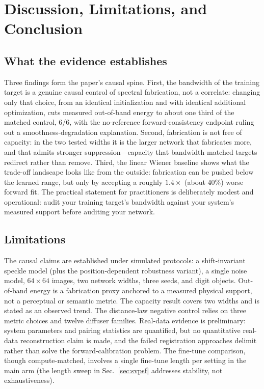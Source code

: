 \section{Discussion, Limitations, and Conclusion}
\label{sec:discussion}

\subsection{What the evidence establishes}

Three findings form the paper's causal spine. First, the bandwidth of the training target is a genuine causal control of spectral fabrication, not a correlate: changing only that choice, from an identical initialization and with identical additional optimization, cuts measured out-of-band energy to about one third of the matched control, 6/6, with the no-reference forward-consistency endpoint ruling out a smoothness-degradation explanation. Second, fabrication is not free of capacity: in the two tested widths it is the larger network that fabricates more, and that admits stronger suppression---capacity that bandwidth-matched targets redirect rather than remove. Third, the linear Wiener baseline shows what the trade-off landscape looks like from the outside: fabrication can be pushed below the learned range, but only by accepting a roughly $1.4\times$ (about $40\%$) worse forward fit. The practical statement for practitioners is deliberately modest and operational: audit your training target's bandwidth against your system's measured support before auditing your network.

\subsection{Limitations}

The causal claims are established under simulated protocols: a shift-invariant speckle model (plus the position-dependent robustness variant), a single noise model, $64\times64$ images, two network widths, three seeds, and digit objects. Out-of-band energy is a fabrication proxy anchored to a measured physical support, not a perceptual or semantic metric. The capacity result covers two widths and is stated as an observed trend. The distance-law negative control relies on three metric choices and twelve diffuser families. Real-data evidence is preliminary: system parameters and pairing statistics are quantified, but no quantitative real-data reconstruction claim is made, and the failed registration approaches delimit rather than solve the forward-calibration problem. The fine-tune comparison, though compute-matched, involves a single fine-tune length per setting in the main arm (the length sweep in Sec.~\ref{sec:svpsf} addresses stability, not exhaustiveness).

